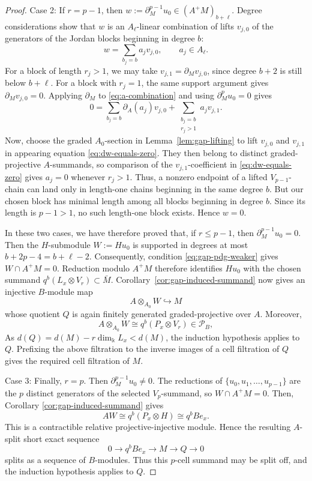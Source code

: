 \documentclass[11pt]{article}
\theoremstyle{definition}
\numberwithin{equation}{section}
\newcommand{\kk}{\Bbbk}
\newcommand{\Pun}{\mathcal{P}_B}
\begin{document}
\begin{proof}
Case 2: If $r=p-1$, then
$ w:=\partial_M^{p-1}u_0\in (A^+M)_{b+\ell}$.   
Degree considerations show that $w$ is an $A_\ell$-linear combination of lifts $v_{j,0}$ of the generators of the Jordan blocks beginning in degree $b$:
\begin{equation}\label{eq:a-combination}
w=\sum_{b_j=b}a_j v_{j,0},
\qquad
a_j\in A_\ell.
\end{equation}
For a block of length $r_j>1$, we may take
$v_{j,1}=\partial_Mv_{j,0}$,
since degree $b+2$ is still below $b+\ell$. For a block with $r_j=1$, the same support argument gives $\partial_Mv_{j,0}=0$. Applying $\partial_M$ to \eqref{eq:a-combination} and using $\partial_M^p u_0=0$ gives
\begin{equation}\label{eq:dw-equals-zero}
0
=
\sum_{b_j=b}\partial_A(a_j)v_{j,0}
+
\sum_{\substack{b_j=b\\ r_j>1}}
a_j v_{j,1}.
\end{equation}
Now, choose the graded $A_0$-section in Lemma~\ref{lem:gap-lifting} to lift $v_{j,0}$ and $v_{j,1}$ in appearing equation \eqref{eq:dw-equals-zero}. They then belong to distinct graded-projective $A$-summands, so comparison of the $v_{j,1}$-coefficient in \eqref{eq:dw-equals-zero} gives $a_j=0$ whenever $r_j>1$.
Thus, a nonzero endpoint of a lifted $V_{p-1}$-chain can land only in length-one chains beginning in the same degree $b$. But our chosen block has minimal length among all blocks beginning in degree $b$. Since its length is $p-1>1$, no such length-one block exists. Hence $w=0$.

In these two cases, we have therefore proved that, if $r\leq p-1$, then $
\partial_M^{p-1}u_0=0$. Then the $H$-submodule $W:=H u_0$
is supported in degrees at most
$b+2p-4=b+\ell-2$.
Consequently, condition \eqref{eq:gap-pdg-weaker} gives $W \cap A^+M=0$.
Reduction modulo $A^+M$ therefore identifies $Hu_0$ with the chosen summand
$q^b(L_x\otimes V_r)\subset\bar{M}$.
Corollary~\ref{cor:gap-induced-summand} now gives an injective $B$-module map
$$
A\otimes_{A_0}W\hookrightarrow M
$$
whose quotient $Q$ is again finitely generated graded-projective over $A$. Moreover,
$$
A\otimes_{A_0}W
\cong
q^b(P_x\otimes V_r) \in \Pun,
$$
As
$d(Q)=d(M)-r\dim_\kk L_x<d(M)$,
the induction hypothesis applies to $Q$. Prefixing the above filtration to the inverse images of a cell filtration of $Q$ gives the required cell filtration of $M$.

Case 3: Finally, $r=p$. Then $\partial_M^{p-1}u_0\ne 0$. The reductions of $\{u_0,u_1,\ldots,u_{p-1}\}$
are the $p$ distinct generators of the selected $V_p$-summand, so
$W\cap A^+M=0$.
Then, Corollary \ref{cor:gap-induced-summand} gives
\begin{equation}\label{eq:free-B-summand}
AW
\cong
q^b(P_x\otimes H)
\cong
q^bBe_x.
\end{equation}
This is a contractible relative projective-injective module. Hence the resulting $A$-split short exact sequence
$$
0\longrightarrow q^bBe_x
\longrightarrow M
\longrightarrow Q
\longrightarrow0
$$
splits as a sequence of $B$-modules. Thus this $p$-cell summand may be split off, and the induction hypothesis applies to $Q$.


\end{proof}
\end{document}
